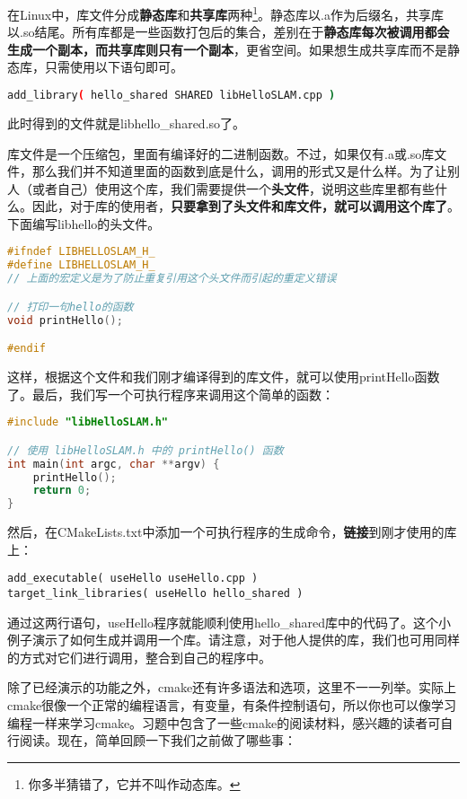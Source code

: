 在Linux中，库文件分成\textbf{静态库}和\textbf{共享库}两种\footnote{你多半猜错了，它并不叫作动态库。}。静态库以.a作为后缀名，共享库以.so结尾。所有库都是一些函数打包后的集合，差别在于\textbf{静态库每次被调用都会生成一个副本，而共享库则只有一个副本}，更省空间。如果想生成共享库而不是静态库，只需使用以下语句即可。
\begin{lstlisting}[language=sh,caption=slambook2/ch2/CMakeLists.txt]
add_library( hello_shared SHARED libHelloSLAM.cpp )
\end{lstlisting}
此时得到的文件就是libhello\_shared.so了。

库文件是一个压缩包，里面有编译好的二进制函数。不过，如果仅有.a或.so库文件，那么我们并不知道里面的函数到底是什么，调用的形式又是什么样。为了让别人（或者自己）使用这个库，我们需要提供一个\textbf{头文件}，说明这些库里都有些什么。因此，对于库的使用者，\textbf{只要拿到了头文件和库文件，就可以调用这个库了}。下面编写libhello的头文件。

\begin{lstlisting}[language=c++,caption=slambook2/ch2/libHelloSLAM.h]
#ifndef LIBHELLOSLAM_H_
#define LIBHELLOSLAM_H_
// 上面的宏定义是为了防止重复引用这个头文件而引起的重定义错误

// 打印一句hello的函数
void printHello();

#endif
\end{lstlisting}

这样，根据这个文件和我们刚才编译得到的库文件，就可以使用printHello函数了。最后，我们写一个可执行程序来调用这个简单的函数：

\begin{lstlisting}[language=c++,caption=slambook2/ch2/useHello.cpp]
#include "libHelloSLAM.h"

// 使用 libHelloSLAM.h 中的 printHello() 函数
int main(int argc, char **argv) {
	printHello();
	return 0;
}
\end{lstlisting}

然后，在CMakeLists.txt中添加一个可执行程序的生成命令，\textbf{链接}到刚才使用的库上：
\begin{lstlisting}[caption=slambook2/ch2/CMakeLists.txt]
add_executable( useHello useHello.cpp )
target_link_libraries( useHello hello_shared )
\end{lstlisting}

通过这两行语句，useHello程序就能顺利使用hello\_shared库中的代码了。这个小例子演示了如何生成并调用一个库。请注意，对于他人提供的库，我们也可用同样的方式对它们进行调用，整合到自己的程序中。

除了已经演示的功能之外，cmake还有许多语法和选项，这里不一一列举。实际上cmake很像一个正常的编程语言，有变量，有条件控制语句，所以你也可以像学习编程一样来学习cmake。习题中包含了一些cmake的阅读材料，感兴趣的读者可自行阅读。现在，简单回顾一下我们之前做了哪些事：

